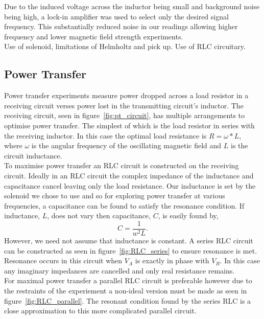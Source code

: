 \documentclass[11pt]{iopart}
\begin{document}
Due to the induced voltage across the inductor being small and background noise being high, a lock-in amplifier was used to select only the desired signal frequency. This substantially reduced noise in our readings allowing higher frequency and lower magnetic field strength experiments.\\

Use of solenoid, limitations of Helmholtz and pick up.
Use of RLC circuitary.

\subsection{Power Transfer}
Power transfer experiments measure power dropped across a load
resistor in a receiving circuit verses power lost in the transmitting
circuit's inductor. The receiving circuit, seen in
figure~\ref{fig:pt_circuit}, has multiple arrangements to optimise
power transfer. The simplest of which is the load resistor in series
with the receiving inductor. In this case the optimal load resistance
is $R = \omega*L$, where $\omega$ is the angular frequency of the
oscillating magnetic field and $L$ is the circuit inductance.\\
To maximise power transfer an RLC circuit is constructed on the
receiving circuit. Ideally in an RLC circuit the complex impedance of
the inductance and capacitance cancel leaving only the load
resistance. Our inductance is set by the solenoid we chose to use and
so for exploring power transfer at various frequencies, a capacitance
can be found to satisfy the resonance condition. If inductance, $L$, does not
vary then capacitance, $C$, is easily found
by,
\begin{equation}
  C = \frac{1}{w^2L}.
\end{equation}
However, we need not assume that inductance is constant. A series RLC
circuit can be constructed as seen in figure~\ref{fig:RLC_series} to
ensure resonance is met. Resonance occurs in this circuit when $V_A$
is exactly in phase with $V_B$. In this case any imaginary impedances
are cancelled and only real resistance remains. \\ For maximal power
transfer a parallel RLC circuit is preferable however due to the
restraints of the experiement a non-ideal version must be made as seen
in figure~\ref{fig:RLC_parallel}. The resonant condition found by the
series RLC is a close approximation to this more complicated parallel
circuit. \\
\end{document}
